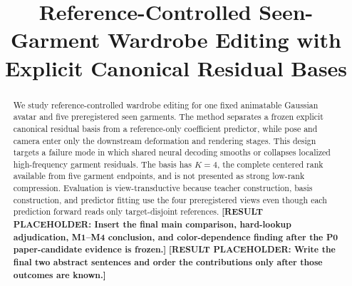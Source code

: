 \documentclass[10pt]{article}
\title{Reference-Controlled Seen-Garment Wardrobe Editing with Explicit Canonical Residual Bases}
\date{}
\newcommand{\resultplaceholder}[1]{\textbf{[RESULT PLACEHOLDER: #1]}}
\begin{document}
\maketitle

\begin{abstract}
We study reference-controlled wardrobe editing for one fixed animatable Gaussian avatar and five preregistered seen garments. The method separates a frozen explicit canonical residual basis from a reference-only coefficient predictor, while pose and camera enter only the downstream deformation and rendering stages. This design targets a failure mode in which shared neural decoding smooths or collapses localized high-frequency garment residuals. The basis has $K=4$, the complete centered rank available from five garment endpoints, and is not presented as strong low-rank compression. Evaluation is view-transductive because teacher construction, basis construction, and predictor fitting use the four preregistered views even though each prediction forward reads only target-disjoint references. \resultplaceholder{Insert the final main comparison, hard-lookup adjudication, M1--M4 conclusion, and color-dependence finding after the P0 paper-candidate evidence is frozen.} \resultplaceholder{Write the final two abstract sentences and order the contributions only after those outcomes are known.}
\end{abstract}









\end{document}
